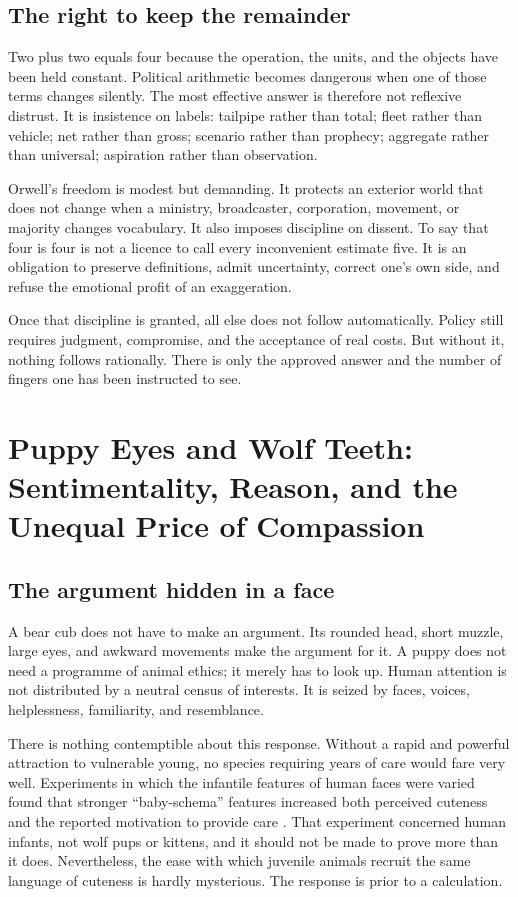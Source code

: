 ﻿\documentclass[12pt,a4paper]{book}
\begin{document}
\section{The right to keep the remainder}

Two plus two equals four because the operation, the units, and the objects have
been held constant.  Political arithmetic becomes dangerous when one of those
terms changes silently.  The most effective answer is therefore not reflexive
distrust.  It is insistence on labels: tailpipe rather than total; fleet rather
than vehicle; net rather than gross; scenario rather than prophecy; aggregate
rather than universal; aspiration rather than observation.

Orwell's freedom is modest but demanding.  It protects an exterior world that
does not change when a ministry, broadcaster, corporation, movement, or
majority changes vocabulary.  It also imposes discipline on dissent.  To say
that four is four is not a licence to call every inconvenient estimate five.
It is an obligation to preserve definitions, admit uncertainty, correct one's
own side, and refuse the emotional profit of an exaggeration.

Once that discipline is granted, all else does not follow automatically.
Policy still requires judgment, compromise, and the acceptance of real costs.
But without it, nothing follows rationally.  There is only the approved answer
and the number of fingers one has been instructed to see.


\chapter[Puppy Eyes and Wolf Teeth]{Puppy Eyes and Wolf Teeth: Sentimentality, Reason, and the Unequal Price of Compassion}
\label{chap:sentimentality-rationality}

\section{The argument hidden in a face}

A bear cub does not have to make an argument.  Its rounded head, short muzzle,
large eyes, and awkward movements make the argument for it.  A puppy does not
need a programme of animal ethics; it merely has to look up.  Human attention
is not distributed by a neutral census of interests.  It is seized by faces,
voices, helplessness, familiarity, and resemblance.

There is nothing contemptible about this response.  Without a rapid and
powerful attraction to vulnerable young, no species requiring years of care
would fare very well.  Experiments in which the infantile features of human
faces were varied found that stronger ``baby-schema'' features increased both
perceived cuteness and the reported motivation to provide care
\cite{GlockerBabySchema2009}.  That experiment concerned human infants, not
wolf pups or kittens, and it should not be made to prove more than it does.
Nevertheless, the ease with which juvenile animals recruit the same language
of cuteness is hardly mysterious.  The response is prior to a calculation.
\end{document}
